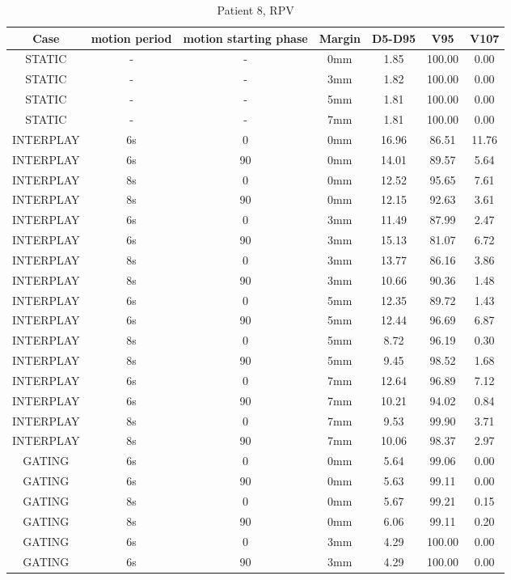 \begin{table}[H]
  \centering
  \caption{Patient 8, RPV}
   \begin{tabular}{|c||c|c|c||c|c|c|}
    \hline\hline
    Case & motion period & motion starting phase & Margin & D5-D95 & V95 & V107\\
    \hline 
STATIC & - & - & 0mm & 1.85 & 100.00 & 0.00 \\
STATIC & - & - & 3mm & 1.82 & 100.00 & 0.00 \\
STATIC & - & - & 5mm & 1.81 & 100.00 & 0.00 \\
STATIC & - & - & 7mm & 1.81 & 100.00 & 0.00 \\
INTERPLAY & 6s & 0 & 0mm & 16.96 & 86.51 & 11.76 \\
INTERPLAY & 6s & 90 & 0mm & 14.01 & 89.57 & 5.64 \\
INTERPLAY & 8s & 0 & 0mm & 12.52 & 95.65 & 7.61 \\
INTERPLAY & 8s & 90 & 0mm & 12.15 & 92.63 & 3.61 \\
INTERPLAY & 6s & 0 & 3mm & 11.49 & 87.99 & 2.47 \\
INTERPLAY & 6s & 90 & 3mm & 15.13 & 81.07 & 6.72 \\
INTERPLAY & 8s & 0 & 3mm & 13.77 & 86.16 & 3.86 \\
INTERPLAY & 8s & 90 & 3mm & 10.66 & 90.36 & 1.48 \\
INTERPLAY & 6s & 0 & 5mm & 12.35 & 89.72 & 1.43 \\
INTERPLAY & 6s & 90 & 5mm & 12.44 & 96.69 & 6.87 \\
INTERPLAY & 8s & 0 & 5mm & 8.72 & 96.19 & 0.30 \\
INTERPLAY & 8s & 90 & 5mm & 9.45 & 98.52 & 1.68 \\
INTERPLAY & 6s & 0 & 7mm & 12.64 & 96.89 & 7.12 \\
INTERPLAY & 6s & 90 & 7mm & 10.21 & 94.02 & 0.84 \\
INTERPLAY & 8s & 0 & 7mm & 9.53 & 99.90 & 3.71 \\
INTERPLAY & 8s & 90 & 7mm & 10.06 & 98.37 & 2.97 \\
GATING & 6s & 0 & 0mm & 5.64 & 99.06 & 0.00 \\
GATING & 6s & 90 & 0mm & 5.63 & 99.11 & 0.00 \\
GATING & 8s & 0 & 0mm & 5.67 & 99.21 & 0.15 \\
GATING & 8s & 90 & 0mm & 6.06 & 99.11 & 0.20 \\
GATING & 6s & 0 & 3mm & 4.29 & 100.00 & 0.00 \\
GATING & 6s & 90 & 3mm & 4.29 & 100.00 & 0.00 \\

\end{tabular}
\end{table}
